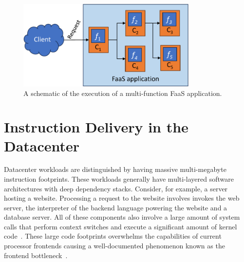 \documentclass[../main.tex]{subfiles}
\begin{document}
\begin{refsection}[main-bib]

\begin{figure}[ht]
  \centering
\includegraphics[width=0.8\textwidth]{papers/paper5-cofaas/figures/faas_application.pdf}
\caption{\label{fig:faas-app} A schematic of the execution of a multi-function FaaS application.}
\end{figure}

\section{Instruction Delivery in the Datacenter}
\label{sec:instr-delivery}

\label{sec:btb-background}


Datacenter workloads are distinguished by having massive
multi-megabyte instruction footprints. These workloads generally have
multi-layered software architectures with deep dependency
stacks. Consider, for example, a server hosting a website. Processing
a request to the website involves invokes the web server, the
interpreter of the backend language powering the website and a
database server. All of these components also involve a large amount
of system calls that perform context switches and execute a
significant amount of kernel
code~\cite{ferdman12_clear_cloud,ailamaki99_dbmss_moder_proces}. These
large code footprints overwhelms the capabilities of current processor
frontends causing a well-documented phenomenon known as the frontend
bottleneck~\cite{kanev15_profil,ferdman12_clear_cloud,ayers19_asmdb,kanev15_profil,kumar17_boomer,kumar18_blast_throug_front_end_bottl_with_shotg,kumar20_shoot_down_server_front_end_bottl,spracklen05_effec_instr_prefet_chip_multip}.



\end{refsection}
\end{document}

